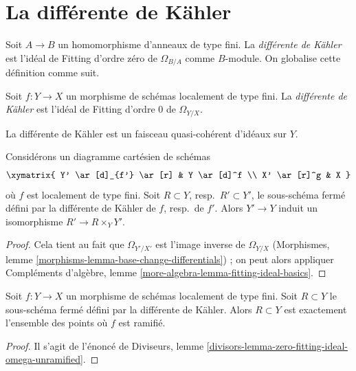 \section{La différente de Kähler}
\label{section-kahler-different}

\noindent
Soit $A \to B$ un homomorphisme d'anneaux de type fini. La {\it différente de Kähler} est
l'idéal de Fitting d'ordre zéro de $\Omega_{B/A}$ comme $B$-module. On globalise cette
définition comme suit.

\begin{definition}
\label{definition-kahler-different}
Soit $f : Y \to X$ un morphisme de schémas localement de type fini.
La {\it différente de Kähler} est l'idéal de Fitting d'ordre $0$ de $\Omega_{Y/X}$.
\end{definition}

\noindent
La différente de Kähler est un faisceau quasi-cohérent d'idéaux sur $Y$.

\begin{lemma}
\label{lemma-base-change-kahler-different}
Considérons un diagramme cartésien de schémas
$$
\xymatrix{
Y' \ar[d]_{f'} \ar[r] & Y \ar[d]^f \\
X' \ar[r]^g & X
}
$$
où $f$ est localement de type fini. Soit $R \subset Y$, resp.\ $R' \subset Y'$,
le sous-schéma fermé défini par la différente de Kähler de $f$, resp.\ de $f'$.
Alors $Y' \to Y$ induit un isomorphisme $R' \to R \times_Y Y'$.
\end{lemma}

\begin{proof}
Cela tient au fait que $\Omega_{Y'/X'}$ est l'image inverse de $\Omega_{Y/X}$
(Morphismes, lemme \ref{morphisms-lemma-base-change-differentials}) ;
on peut alors appliquer
Compléments d'algèbre, lemme \ref{more-algebra-lemma-fitting-ideal-basics}.
\end{proof}

\begin{lemma}
\label{lemma-kahler-different}
Soit $f : Y \to X$ un morphisme de schémas localement de type fini.
Soit $R \subset Y$ le sous-schéma fermé défini par
la différente de Kähler. Alors $R \subset Y$ est exactement
l'ensemble des points où $f$ est ramifié.
\end{lemma}

\begin{proof}
Il s'agit de l'énoncé de
Diviseurs, lemme \ref{divisors-lemma-zero-fitting-ideal-omega-unramified}.
\end{proof}

